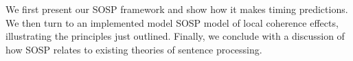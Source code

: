 \documentclass[10pt,letterpaper]{article}
\begin{document}


We first present our SOSP framework and show how it makes timing predictions. We then turn to an implemented model SOSP model of local coherence effects, illustrating the principles just outlined. Finally, we conclude with a discussion of how SOSP relates to existing theories of sentence processing.


\end{document}

